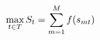 \begin{equation}\label{eq:satisfaction}
	\centering
	\max_{t \in T} S_t = \sum_{m=1}^{M} f(s_{mt})
\end{equation}

